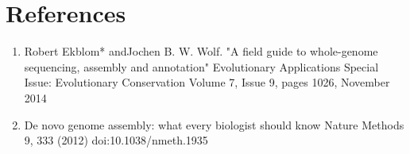 \section{References}

\begin{enumerate}
  \item Robert Ekblom* andJochen B. W. Wolf. "A field guide to whole-genome sequencing, assembly and annotation" Evolutionary Applications Special Issue: Evolutionary Conservation Volume 7, Issue 9, pages 1026, November 2014
  \item De novo genome assembly: what every biologist should know Nature Methods 9, 333 (2012) doi:10.1038/nmeth.1935 
\end{enumerate}
